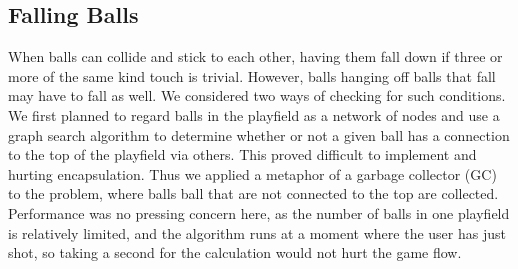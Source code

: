 \subsection{Falling Balls}
\label{sec:garbage}
When balls can collide and stick to each other, having them fall down 
if three or more of the same kind touch is trivial. However, balls 
hanging off balls that fall may have to fall as well. We considered 
two ways of checking for such conditions. We first planned to regard balls in the 
playfield as a network of nodes and use a graph search algorithm to determine 
whether or not a given ball has a connection to the top of the playfield via 
others. This proved difficult to implement and hurting encapsulation. Thus 
we applied a metaphor of a garbage collector (GC) to the problem, where balls
ball that are not connected to the top are collected. Performance was no pressing 
concern here, as the number of balls in one playfield is relatively limited, 
and the algorithm runs at a moment where the user has just shot, so taking a second 
for the calculation would not hurt the game flow.
%
